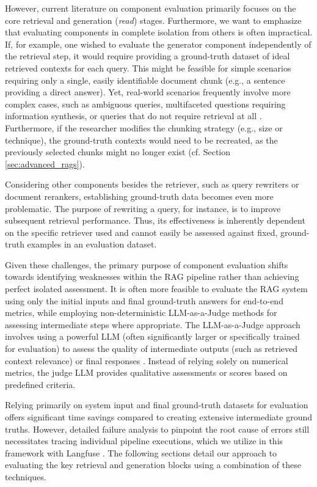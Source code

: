 However, current literature on component evaluation primarily focuses on the core retrieval and generation (\textit{read}) stages. Furthermore, we want to emphasize that evaluating components in complete isolation from others is often impractical. If, for example, one wished to evaluate the generator component independently of the retrieval step, it would require providing a ground-truth dataset of ideal retrieved contexts for each query. This might be feasible for simple scenarios requiring only a single, easily identifiable document chunk (e.g., a sentence providing a direct answer). Yet, real-world scenarios frequently involve more complex cases, such as ambiguous queries, multifaceted questions requiring information synthesis, or queries that do not require retrieval at all \cite{Huang_2023}. Furthermore, if the researcher modifies the chunking strategy (e.g., size or technique), the ground-truth contexts would need to be recreated, as the previously selected chunks might no longer exist (cf. Section \ref{sec:advanced_rags}).

Considering other components besides the retriever, such as query rewriters or document rerankers, establishing ground-truth data becomes even more problematic. The purpose of rewriting a query, for instance, is to improve subsequent retrieval performance. Thus, its effectiveness is inherently dependent on the specific retriever used and cannot easily be assessed against fixed, ground-truth examples in an evaluation dataset.

Given these challenges, the primary purpose of component evaluation shifts towards identifying weaknesses within the RAG pipeline rather than achieving perfect isolated assessment. It is often more feasible to evaluate the RAG system using only the initial inputs and final ground-truth answers for end-to-end metrics, while employing non-deterministic LLM-as-a-Judge methods for assessing intermediate steps where appropriate. The LLM-as-a-Judge approach involves using a powerful LLM (often significantly larger or specifically trained for evaluation) to assess the quality of intermediate outputs (such as retrieved context relevance) or final responses \cite{Chiang.2023}. Instead of relying solely on numerical metrics, the judge LLM provides qualitative assessments or scores based on predefined criteria.

Relying primarily on system input and final ground-truth datasets for evaluation offers significant time savings compared to creating extensive intermediate ground truths. However, detailed failure analysis to pinpoint the root cause of errors still necessitates tracing individual pipeline executions, which we utilize in this framework with Langfuse \cite{Langfuse}. The following sections detail our approach to evaluating the key retrieval and generation blocks using a combination of these techniques.

